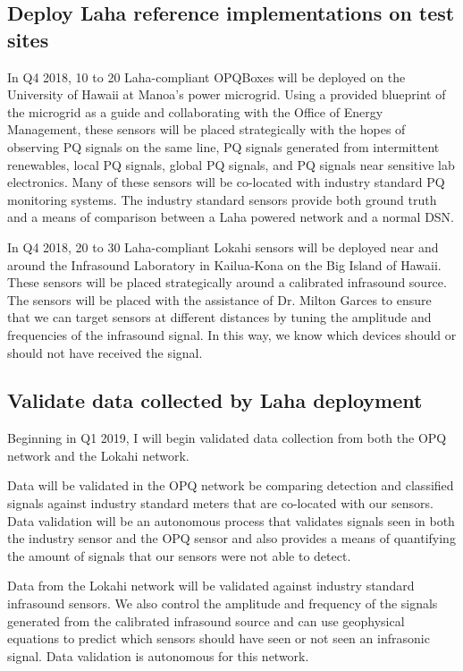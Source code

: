 \subsection{Deploy Laha reference implementations on test sites}
In Q4 2018, 10 to 20 Laha-compliant OPQBoxes will be deployed on the University of Hawaii at Manoa's power microgrid. Using a provided blueprint of the microgrid as a guide and collaborating with the Office of Energy Management, these sensors will be placed strategically with the hopes of observing PQ signals on the same line, PQ signals generated from intermittent renewables, local PQ signals, global PQ signals, and PQ signals near sensitive lab electronics. Many of these sensors will be co-located with industry standard PQ monitoring systems. The industry standard sensors provide both ground truth and a means of comparison between a Laha powered network and a normal DSN. 

In Q4 2018,  20 to 30 Laha-compliant Lokahi sensors will be deployed near and around the Infrasound Laboratory in Kailua-Kona on the Big Island of Hawaii. These sensors will be placed strategically around a calibrated infrasound source. The sensors will be placed with the assistance of Dr. Milton Garces to ensure that we can target sensors at different distances by tuning the amplitude and frequencies of the infrasound signal. In this way, we know which devices should or should not have received the signal.

\subsection{Validate data collected by Laha deployment}
Beginning in Q1 2019, I will begin validated data collection from both the OPQ network and the Lokahi network. 

Data will be validated in the OPQ network be comparing detection and classified signals against industry standard meters that are co-located with our sensors. Data validation will be an autonomous process that validates signals seen in both the industry sensor and the OPQ sensor and also provides a means of quantifying the amount of signals that our sensors were not able to detect. 

Data from the Lokahi network will be validated against industry standard infrasound sensors. We also control the amplitude and frequency of the signals generated from the calibrated infrasound source and can use geophysical equations to predict which sensors should have seen or not seen an infrasonic signal. Data validation is autonomous for this network.

